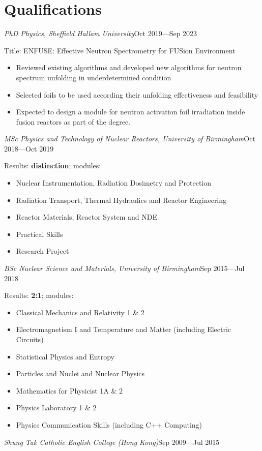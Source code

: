 \documentclass[a4paper, 12pt]{article}
\newcommand{\expentry}[3]{\emph{#1}\hfill{#2}---{#3}}
\begin{document}
\section{Qualifications}
\expentry{PhD Physics, Sheffield Hallam University}{Oct 2019}{Sep 2023}
    
    Title: ENFUSE: Effective Neutron Spectrometry for FUSion Environment
    \begin{itemize}
    \setlength\itemsep{0em}
    \item Reviewed existing algorithms and developed new algorithms for neutron spectrum unfolding in underdetermined condition
    \item Selected foils to be used according their unfolding effectiveness and feasibility
    \item Expected to design a module for neutron activation foil irradiation inside fusion reactors as part of the degree.
    \end{itemize}
\begin{adjustwidth}{-0.3cm}{-0.7cm} %
\expentry{MSc Physics and Technology of Nuclear Reactors, University of Birmingham}{Oct 2018}{Oct 2019}
\end{adjustwidth} %

    Results: \textbf{distinction}; modules:
    \begin{itemize}
    \setlength\itemsep{0em}
    \item Nuclear Instrumentation, Radiation Dosimetry and Protection
    \item Radiation Transport, Thermal Hydraulics and Reactor Engineering
    \item Reactor Materials, Reactor System and NDE
    \item Practical Skills
    \item Research Project
    \end{itemize}
\expentry{BSc Nuclear Science and Materials, University of Birmingham} {Sep 2015}{Jul 2018}

    Results: \textbf{2:1}; modules:
    \begin{itemize}
    \setlength\itemsep{0em}
    \item Classical Mechanics and Relativity 1 \& 2
    \item Electromagnetism I and Temperature and Matter (including Electric Circuits)
    \item Statistical Physics and Entropy
    \item Particles and Nuclei and Nuclear Physics
    \item Mathematics for Physicist 1A \& 2
    \item Physics Laboratory 1 \& 2
    \item Physics Communication Skills (including C++ Computing)
    \end{itemize}
\expentry{Shung Tak Catholic English College (Hong Kong)}{Sep 2009}{Jul 2015}
    
\end{document}
